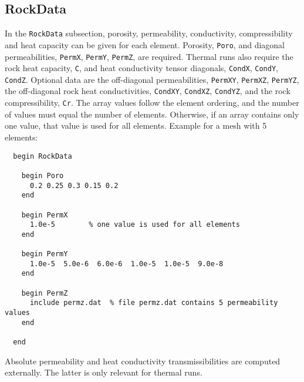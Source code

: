 \subsection{RockData}
\label{sec:rockdata}

In the \texttt{RockData} subsection, porosity, permeability,
conductivity, compressibility and heat capacity can be given for each
element. Porosity, \texttt{Poro}, and diagonal permeabilities,
\texttt{PermX}, \texttt{PermY}, \texttt{PermZ}, are required. Thermal
runs also require the rock heat capacity, \texttt{C}, and heat
conductivity tensor diagonals, \texttt{CondX}, \texttt{CondY},
\texttt{CondZ}. Optional data are the off-diagonal permeabilities,
\texttt{PermXY}, \texttt{PermXZ}, \texttt{PermYZ}, the off-diagonal
rock heat conductivities, \texttt{CondXY}, \texttt{CondXZ},
\texttt{CondYZ}, and the rock compressibility, \texttt{Cr}. The array
values follow the element ordering, and the number of values must
equal the number of elements. Otherwise, if an array contains only one
value, that value is used for all elements. Example for a mesh with 5
elements:
%
\begin{verbatim}
  begin RockData

    begin Poro
      0.2 0.25 0.3 0.15 0.2
    end
  
    begin PermX
      1.0e-5        % one value is used for all elements      
    end
  
    begin PermY
      1.0e-5  5.0e-6  6.0e-6  1.0e-5  1.0e-5  9.0e-8
    end
  
    begin PermZ
      include permz.dat  % file permz.dat contains 5 permeability values
    end

  end
\end{verbatim}
%

\label{sec:transmissibilities}

Absolute permeability and heat conductivity transmissibilities are
computed externally. The latter is only relevant for thermal runs.

